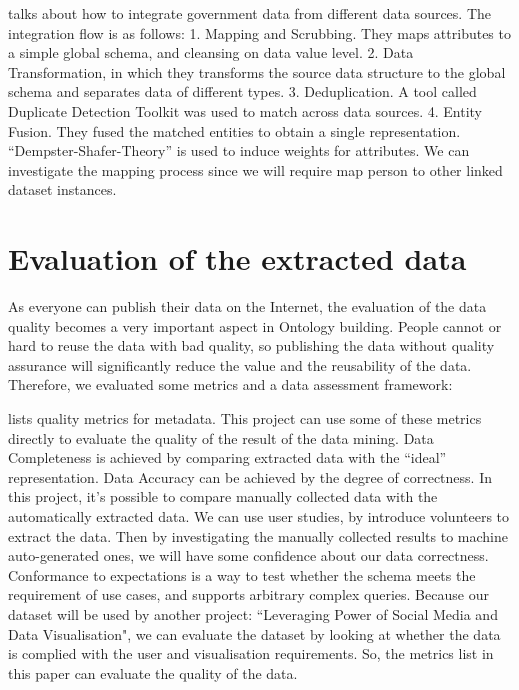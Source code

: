 \cite{bohm2010} talks about how to integrate government data from different data sources. The integration flow is as follows: 1. Mapping and Scrubbing. They maps attributes to a simple global schema, and cleansing on data value level. 2. Data Transformation, in which they transforms the source data structure to the global schema and separates data of different types. 3. Deduplication. A tool called Duplicate Detection Toolkit was used to match across data sources. 4. Entity Fusion. They fused the matched entities to obtain a single representation. ``Dempster-Shafer-Theory'' is used to induce weights for attributes. We can investigate the mapping process since we will require map person to other linked dataset instances.

\section{Evaluation of the extracted data}

As everyone can publish their data on the Internet, the evaluation of the data quality becomes a very important aspect in Ontology building. People cannot or hard to reuse the data with bad quality, so publishing the data without quality assurance will significantly reduce the value and the reusability of the data. Therefore, we evaluated some metrics and a data assessment framework:

\cite{ochoa2006} lists quality metrics for metadata. This project can use some of these metrics directly to evaluate the quality of the result of the data mining. Data Completeness is achieved by comparing extracted data with the ``ideal'' representation. Data Accuracy can be achieved by the degree of correctness. In this project, it's possible to compare manually collected data with the automatically extracted data. We can use user studies, by introduce volunteers to extract the data. Then by investigating the manually collected results to machine auto-generated ones, we will have some confidence about our data correctness. Conformance to expectations is a way to test whether the schema meets the requirement of use cases, and supports arbitrary complex queries. Because our dataset will be used by another project: ``Leveraging Power of Social Media and Data Visualisation", we can evaluate the dataset by looking at whether the data is complied with the user and visualisation requirements. So, the metrics list in this paper can evaluate the quality of the data.


